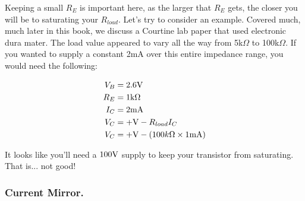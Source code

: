 \documentclass[12pt]{report}
\newcommand{\V}{{\rm V}}
\begin{document}
Keeping a small $R_E$ is important here, as the larger that $R_E$ gets, the closer you will be to saturating your $R_{load}$. Let's try to consider an example. Covered much, much later in this book, we discuss a Courtine lab paper that used electronic dura mater. The load value appeared to vary all the way from 5k$\Omega$ to 100k$\Omega$. If you wanted to supply a constant 2mA over this entire impedance range, you would need the following:\newline

\begin{equation} \label{trans3}
\begin{split}
V_B &= 2.6\V \\
R_E &= 1\mathrm{k}\Omega \\
I_C &= 2\mathrm{mA} \\
V_C &= +\V - R_{load}I_C \\
V_C &= +\V - (100k\Omega \times 1\mathrm{mA}) \\
\end{split}
\end{equation}

It looks like you'll need a $100\V$ supply to keep your transistor from saturating. That is... not good! 

\vfill\pagebreak

\subsubsection{Current Mirror.}
\end{document}
